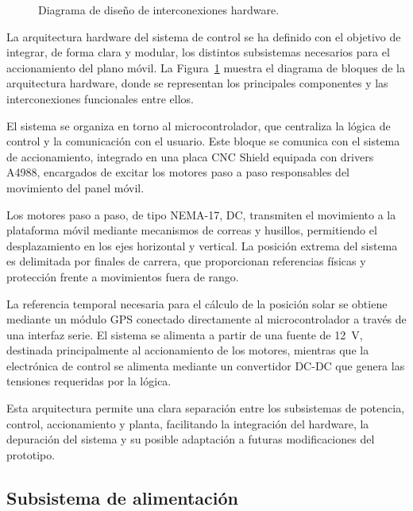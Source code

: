\begin{figure}[t]
	\centering
	
	\caption{Diagrama de diseño de interconexiones hardware.}
	\label{fig:dis_elect}
\end{figure}


La arquitectura hardware del sistema de control se ha definido con el objetivo de integrar, de forma clara y  modular, los distintos subsistemas necesarios para el accionamiento del plano móvil. La Figura~\ref{fig:dis_elect} muestra el diagrama de bloques de la arquitectura hardware, donde se representan los principales componentes y las interconexiones funcionales entre ellos.

El sistema se organiza en torno al microcontrolador, que centraliza la lógica de control y la comunicación con el usuario. Este bloque se comunica con el sistema de accionamiento, integrado en una placa CNC Shield equipada con drivers A4988, encargados de excitar los motores paso a paso responsables del movimiento del panel móvil.

Los motores paso a paso, de tipo NEMA-17, DC,  transmiten el movimiento a la plataforma móvil mediante mecanismos de correas y husillos, permitiendo el desplazamiento en los ejes horizontal y vertical. La posición extrema del sistema es delimitada por finales de carrera, que proporcionan referencias físicas y protección frente a movimientos fuera de rango.

La referencia temporal necesaria para el cálculo de la posición solar se obtiene mediante un módulo GPS conectado directamente al microcontrolador a través de una interfaz serie. El sistema se alimenta a partir de una fuente de 12~V, destinada principalmente al accionamiento de los motores, mientras que la electrónica de control se alimenta mediante un convertidor DC-DC que genera las tensiones requeridas por la lógica.

Esta arquitectura permite una clara separación entre los subsistemas de potencia, control, accionamiento y planta, facilitando la integración del hardware, la depuración del sistema y su posible adaptación a futuras modificaciones del prototipo.

\FloatBarrier

\subsection{Subsistema de alimentación}

